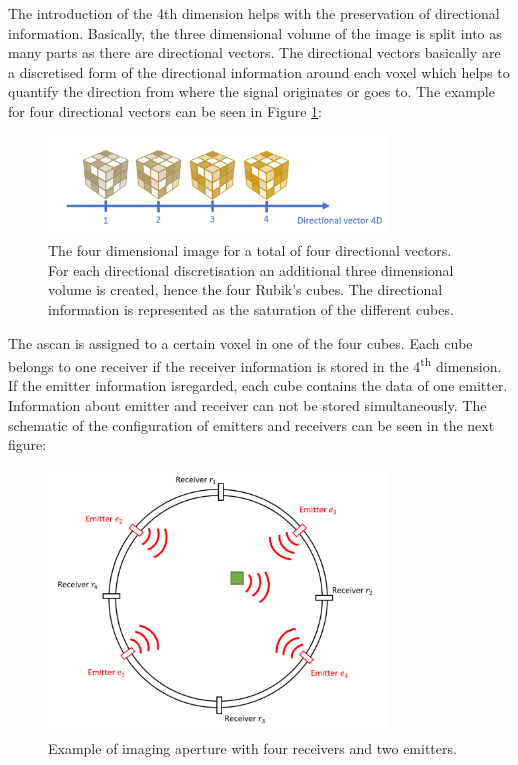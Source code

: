 The introduction of the 4th dimension helps with the preservation of directional information. Basically, the three dimensional volume of the image is split into as many parts as there are directional vectors. The directional vectors basically are a discretised form of the directional information around each voxel which helps to quantify the direction from where the signal originates or goes to. The example for four directional vectors can be seen in Figure \ref{4D_rubics}:

\begin{figure}[H]
    \centering
    \includegraphics[width=0.8\textwidth]{Graphics/rubicscube4D.png}
    \caption{The four dimensional image for a total of four directional vectors. For each directional discretisation an additional three dimensional volume is created, hence the four Rubik's cubes. The directional information is represented as the saturation of the different cubes.}
    \label{4D_rubics}
\end{figure}

The \ac{ascan} is assigned to a certain voxel in one of the four cubes. Each cube belongs to one receiver if the receiver information is stored in the 4\textsuperscript{th} dimension. If the emitter information isregarded, each cube contains the data of one emitter. Information about emitter and receiver can not be stored simultaneously. The schematic of the configuration of emitters and receivers can be seen in the next figure:

\begin{figure}[H]
    \centering
    \includegraphics[width=0.8\textwidth]{Graphics/problem_4D.png}
    \caption{Example of imaging aperture with four receivers and two emitters.}
    \label{4D_problem}
\end{figure}

